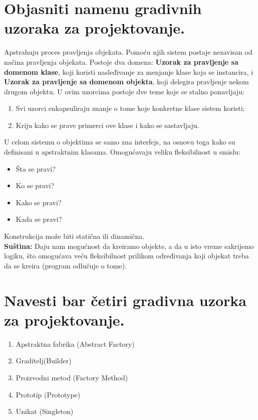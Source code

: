 \documentclass[a4paper]{article}
\begin{document}
\section{Objasniti namenu gradivnih uzoraka za projektovanje.}
  Apstrahuju proces pravljenja objekata. Pomoću njih sistem postaje nezavisan od načina pravljenja 
  objekata. Postoje dva domena: \textbf{Uzorak za pravljenje sa domenom klase}, koji koristi nasleđivanje 
  za menjanje klase koja se instancira, i \textbf{Uzorak za pravljenje sa domenom objekta}, 
  koji delegira pravljenje nekom drugom objektu. U ovim uzorcima postoje dve teme koje se stalno 
  ponavljaju:
  \begin{enumerate}
    \item Svi uzorci enkapsuliraju znanje o tome koje konkretne klase sistem koristi;
    \item Kriju kako se prave primerci ove klase i kako se sastavljaju.
  \end{enumerate}
  U celom sistemu o objektima se samo zna interfejs, na osnovu toga kako su definisani u apstraktnim
  klasama. Omogućavaju veliku fleksibilnost u smislu:
  \begin{itemize}
    \item Šta se pravi?
    \item Ko se pravi?
    \item Kako se pravi?
    \item Kada se pravi?
  \end{itemize}
  Konstrukcija može biti statična ili dinamična.\\

  \textbf{Suština:} Daju nam mogućnost da kreiramo objekte, a da u isto vreme sakrijemo logiku, što 
  omogućava veću fleksibilnost prilikom određivanja koji objekat treba da se kreira
  (program odlučuje o tome).

\section{Navesti bar četiri gradivna uzorka za projektovanje.}
  \begin{enumerate}
    \item Apstraktna fabrika (Abstract Factory)
    \item Graditelj(Builder)
    \item Proizvodni metod (Factory Method)
    \item Prototip (Prototype)
    \item Unikat (Singleton)
  \end{enumerate}
\end{document}
